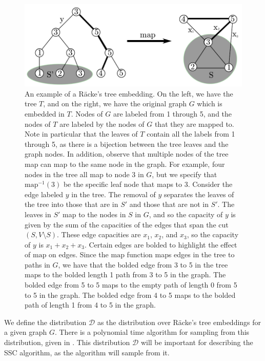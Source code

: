 \documentclass[12pt]{article}
\begin{document}
\begin{figure}
\label{fig:racketree}
\includegraphics[width=\linewidth]{RackeTree.pdf}
\caption{An example of a R\"{a}cke's tree embedding. On the left, we have the tree $T$, and on the right, we have the original graph $G$ which is embedded in $T$. Nodes of $G$ are labeled from 1 through 5, and the nodes of $T$ are labeled by the nodes of $G$ that they are mapped to. Note in particular that the leaves of $T$ contain all the labels from 1 through 5, as there is a bijection between the tree leaves and the graph nodes. In addition, observe that multiple nodes of the tree map can map to the same node in the graph. For example, four nodes in the tree all map to node 3 in $G$, but we specify that $\mathrm{map}^{-1}(3)$ be the specific leaf node that maps to 3.
\newline
\text{ }\hspace{.3in} Consider the edge labeled $y$ in the tree. The removal of $y$ separates the leaves of the tree into those that are in $S'$ and those that are not in $S'$. The leaves in $S'$ map to the nodes in $S$ in $G$, and so the capacity of $y$ is given by the sum of the capacities of the edges that span the cut $(S,V\setminus S)$. These edge capacities are $x_1$, $x_2$, and $x_3$, so the capacity of $y$ is $x_1 + x_2+x_3$.
\newline
\text{ }\hspace{.3in} Certain edges are bolded to highlight the effect of $\mathrm{map}$ on edges. Since the $\mathrm{map}$ function maps edges in the tree to paths in $G$, we have that the bolded edge from 3 to 5 in the tree maps to the bolded length 1 path from 3 to 5 in the graph. The bolded edge from 5 to 5 maps to the empty path of length 0 from 5 to 5 in the graph. The bolded edge from 4 to 5 maps to the bolded path of length 1 from 4 to 5 in the graph.}
\end{figure}

We define the distribution $\mathcal{D}$ as the distribution over R\"{a}cke's tree embeddings for a given graph $G$. There is a polynomial time algorithm for sampling from this distribution, given in \cite{racke}. This distribution $\mathcal{D}$ will be important for describing the SSC algorithm, as the algorithm will sample from it.\\
\end{document}
